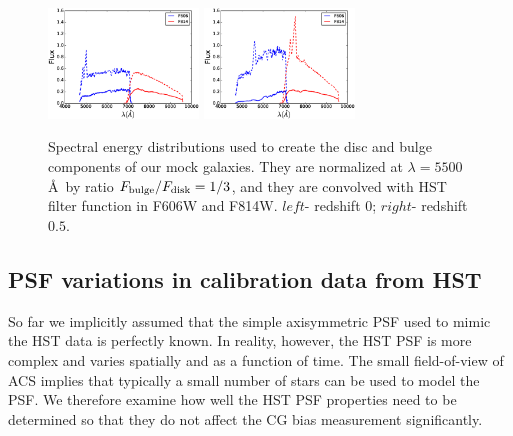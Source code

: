\documentclass[useAMS,usenatbib]{mnras}
\begin{document}
\begin{figure}
\centerline{\includegraphics[width=4.0cm]{z0bandsed.eps}
\includegraphics[width=4.0cm]{z5bandsed.eps}}
\caption{Spectral energy distributions used to create the disc and
  bulge components of our mock galaxies. They are normalized at
  $\lambda=5500$\AA$\,$ by ratio $F_{\rm bulge}/F_{\rm disk}=1/3$, and they
  are convolved with HST filter function in F606W and F814W. $left$-
  redshift $0$; $right$- redshift $0.5$.}
\label{fig:sedz}
\end{figure}

\subsection{PSF variations in calibration data from HST}

So far we implicitly assumed that the simple axisymmetric PSF used to mimic the HST data
is perfectly known. In reality, however, the HST PSF is more complex and varies spatially
and as a function of time. The small field-of-view of ACS implies that typically a small number
of stars can be used to model the PSF.  We therefore examine how well the HST PSF properties need 
to be determined so that they do not affect the CG bias measurement significantly. 
\end{document}
